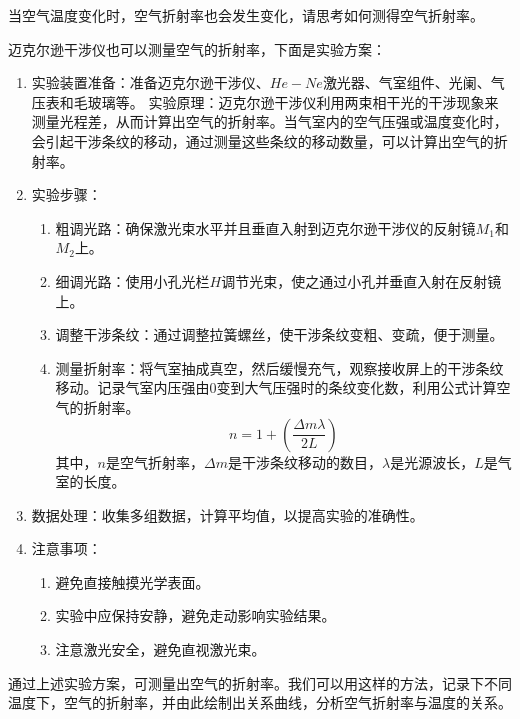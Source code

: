\documentclass[dvipsnames, svgnames,a4paper,11pt]{article}
\begin{document}
\begin{question}
	当空气温度变化时，空气折射率也会发生变化，请思考如何测得空气折射率。
\end{question}
	
	迈克尔逊干涉仪也可以测量空气的折射率，下面是实验方案：
	
	\begin{enumerate}
		\item 实验装置准备：准备迈克尔逊干涉仪、$He-Ne$激光器、气室组件、光阑、气压表和毛玻璃等。
		实验原理：迈克尔逊干涉仪利用两束相干光的干涉现象来测量光程差，从而计算出空气的折射率。当气室内的空气压强或温度变化时，会引起干涉条纹的移动，通过测量这些条纹的移动数量，可以计算出空气的折射率。
		\item 实验步骤：
		 	\begin{enumerate}[label=\roman*.]
				\item 粗调光路：确保激光束水平并且垂直入射到迈克尔逊干涉仪的反射镜$M_1$和$M_2$上。
				
				\item 细调光路：使用小孔光栏$H$调节光束，使之通过小孔并垂直入射在反射镜上。
				
				\item 调整干涉条纹：通过调整拉簧螺丝，使干涉条纹变粗、变疏，便于测量。
				
				\item 测量折射率：将气室抽成真空，然后缓慢充气，观察接收屏上的干涉条纹移动。记录气室内压强由0变到大气压强时的条纹变化数，利用公式计算空气的折射率。
				\[
				n=1+\left(\frac{\Delta m\lambda}{2L}\right)	
				\]
				其中，$n$是空气折射率，$\Delta m$是干涉条纹移动的数目，$\lambda$是光源波长，$L$是气室的长度。
			\end{enumerate}

		\item 数据处理：收集多组数据，计算平均值，以提高实验的准确性。
		 
		\item 注意事项：
			\begin{enumerate}[label=\roman*.]
				\item 避免直接触摸光学表面。
				\item 实验中应保持安静，避免走动影响实验结果。
				\item 注意激光安全，避免直视激光束。
			\end{enumerate}
	\end{enumerate}
	
	通过上述实验方案，可测量出空气的折射率。我们可以用这样的方法，记录下不同温度下，空气的折射率，并由此绘制出关系曲线，分析空气折射率与温度的关系。

	
	
	
	
	
\end{document}
